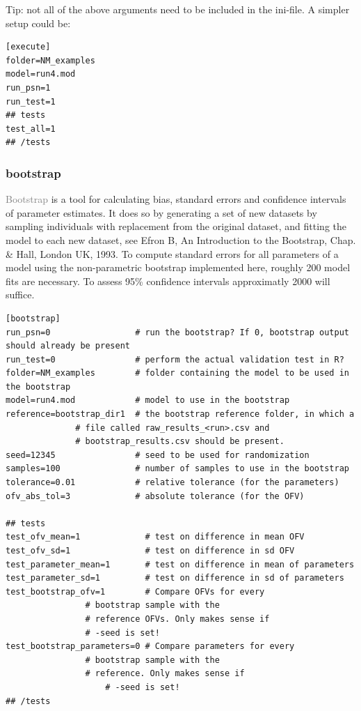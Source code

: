\documentclass[a4,11pt]{report} \usepackage[pdftex]{graphicx}
\newcommand{\psn}[1]{\textcolor{Grey}{#1}}
\begin{document}
\noindent Tip: not all of the above arguments need to be included in
the ini-file. A simpler setup could be:

\begin{lstlisting}
[execute]
folder=NM_examples
model=run4.mod
run_psn=1
run_test=1
## tests
test_all=1
## /tests
\end{lstlisting}

\subsubsection{bootstrap}
\psn{Bootstrap} is a tool for calculating bias, standard errors and
confidence intervals of parameter estimates. It does so by generating
a set of new datasets by sampling individuals with replacement from
the original dataset, and fitting the model to each new dataset, see
Efron B, An Introduction to the Bootstrap, Chap. \& Hall, London UK,
1993. To compute standard errors for all parameters of a model using
the non-parametric bootstrap implemented here, roughly 200 model fits
are necessary. To assess 95\% confidence intervals approximatly 2000
will suffice.

\begin{lstlisting}
[bootstrap]
run_psn=0                 # run the bootstrap? If 0, bootstrap output should already be present
run_test=0                # perform the actual validation test in R?
folder=NM_examples        # folder containing the model to be used in the bootstrap
model=run4.mod            # model to use in the bootstrap
reference=bootstrap_dir1  # the bootstrap reference folder, in which a
			  # file called raw_results_<run>.csv and
			  # bootstrap_results.csv should be present.
seed=12345                # seed to be used for randomization
samples=100               # number of samples to use in the bootstrap
tolerance=0.01            # relative tolerance (for the parameters)
ofv_abs_tol=3             # absolute tolerance (for the OFV)

## tests
test_ofv_mean=1             # test on difference in mean OFV
test_ofv_sd=1               # test on difference in sd OFV
test_parameter_mean=1       # test on difference in mean of parameters
test_parameter_sd=1         # test on difference in sd of parameters
test_bootstrap_ofv=1	    # Compare OFVs for every
			    # bootstrap sample with the
		 	    # reference OFVs. Only makes sense if
		 	    # -seed is set!
test_bootstrap_parameters=0 # Compare parameters for every
			    # bootstrap sample with the
		 	    # reference. Only makes sense if
		            # -seed is set!
## /tests
\end{lstlisting}
\end{document}
